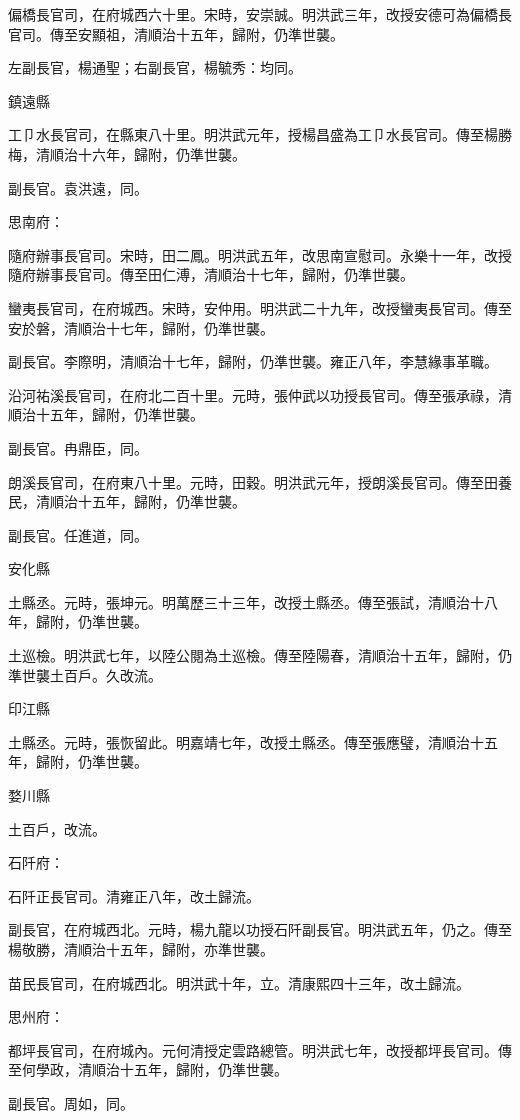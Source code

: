 \begin{pinyinscope}
偏橋長官司，在府城西六十里。宋時，安崇誠。明洪武三年，改授安德可為偏橋長官司。傳至安顯祖，清順治十五年，歸附，仍準世襲。

左副長官，楊通聖；右副長官，楊毓秀：均同。

鎮遠縣

工⼙水長官司，在縣東八十里。明洪武元年，授楊昌盛為工⼙水長官司。傳至楊勝梅，清順治十六年，歸附，仍準世襲。

副長官。袁洪遠，同。

思南府：

隨府辦事長官司。宋時，田二鳳。明洪武五年，改思南宣慰司。永樂十一年，改授隨府辦事長官司。傳至田仁溥，清順治十七年，歸附，仍準世襲。

蠻夷長官司，在府城西。宋時，安仲用。明洪武二十九年，改授蠻夷長官司。傳至安於磐，清順治十七年，歸附，仍準世襲。

副長官。李際明，清順治十七年，歸附，仍準世襲。雍正八年，李慧緣事革職。

沿河祐溪長官司，在府北二百十里。元時，張仲武以功授長官司。傳至張承祿，清順治十五年，歸附，仍準世襲。

副長官。冉鼎臣，同。

朗溪長官司，在府東八十里。元時，田穀。明洪武元年，授朗溪長官司。傳至田養民，清順治十五年，歸附，仍準世襲。

副長官。任進道，同。

安化縣

土縣丞。元時，張坤元。明萬歷三十三年，改授土縣丞。傳至張試，清順治十八年，歸附，仍準世襲。

土巡檢。明洪武七年，以陸公閱為土巡檢。傳至陸陽春，清順治十五年，歸附，仍準世襲土百戶。久改流。

印江縣

土縣丞。元時，張恢留此。明嘉靖七年，改授土縣丞。傳至張應璧，清順治十五年，歸附，仍準世襲。

婺川縣

土百戶，改流。

石阡府：

石阡正長官司。清雍正八年，改土歸流。

副長官，在府城西北。元時，楊九龍以功授石阡副長官。明洪武五年，仍之。傳至楊敬勝，清順治十五年，歸附，亦準世襲。

苗民長官司，在府城西北。明洪武十年，立。清康熙四十三年，改土歸流。

思州府：

都坪長官司，在府城內。元何清授定雲路總管。明洪武七年，改授都坪長官司。傳至何學政，清順治十五年，歸附，仍準世襲。

副長官。周如，同。


\end{pinyinscope}

